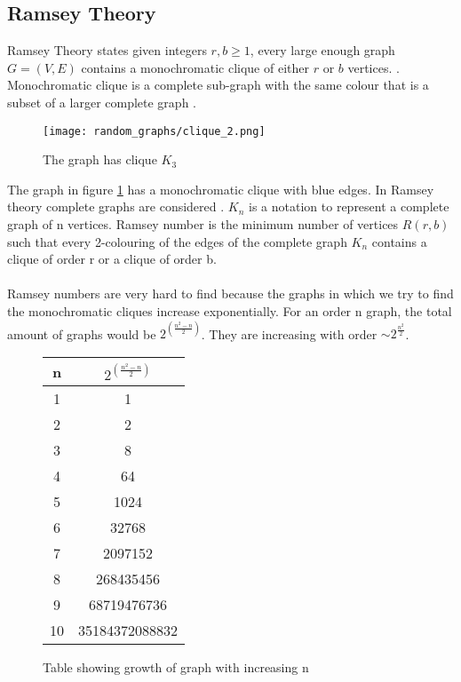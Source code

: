 \documentclass{Assignment}
\begin{document}
\subsection{Ramsey Theory}
Ramsey Theory states given integers $ r,b\geq 1$, every large enough graph $G = (V,E)$ contains a monochromatic clique of either $r$ or $b$ vertices.  \cite{katz2018introduction}.
Monochromatic clique is a complete sub-graph with the same colour that is a subset of a larger complete graph \cite{BondyMurty2008}.
\begin{figure}[H]
	\centering
	\texttt{[image: random\_graphs/clique\_2.png]}
	\caption{The graph has clique $K_3$}
	\label{clique}
\end{figure}
The graph in figure \ref{clique} has a monochromatic clique with blue edges.
In Ramsey theory complete graphs are considered \cite{burr1981generalized}.
$K_n$ is a notation to represent a complete graph of n vertices.
Ramsey number is the minimum number of vertices $R(r,b)$ such that every 2-colouring of the edges of the complete graph $K_n$ contains a clique of order r or a clique of order b.
\\\\
Ramsey numbers are very hard to find because the graphs in which we try to find the monochromatic cliques increase exponentially.
For an order n graph, the total amount of graphs would be $2^{\left(\frac{n^2-n}{2}\right)}$.
They are increasing with order $\sim 2^{\frac{n^2}{2}}$.
\begin{figure}[H]
\begin{center}

	\begin{tabular}{|c|c|}
		n&$2^{\left(\frac{n^2-n}{2}\right)}$\\
		\hline
		1  & 1 \\\hline
		2  & 2 \\\hline
		3  & 8 \\\hline
		4  & 64 \\\hline
		5  & 1024 \\\hline
		6  & 32768 \\\hline
		7 & 2097152 \\\hline
		8  & 268435456 \\\hline
		9  & 68719476736 \\\hline
		10  & 35184372088832 \\
		\hline
	\end{tabular}
	
\caption{Table showing growth of graph with increasing n}
\label{tableofn}
\end{center}
\end{figure}
\end{document}
